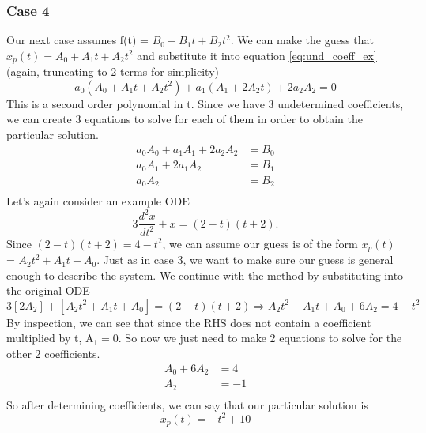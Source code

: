 \documentclass{article}
\newcommand{\be}{\begin{equation}}
\newcommand{\ee}{\end{equation}}
\begin{document}
\subsubsection*{Case 4}
Our next case assumes f(t) = $B_0 + B_1t + B_2t^2$. We can make the guess that $x_p(t) = A_0 + A_1t + A_2t^2$ and substitute it into equation \ref{eq:und_coeff_ex} (again, truncating to 2 terms for simplicity)
\be
a_0\left(A_0 + A_1t + A_2t^2\right) + a_1\left(A_1 + 2A_2t\right) + 2a_2A_2 = 0
\ee
This is a second order polynomial in t. Since we have 3 undetermined coefficients, we can create 3 equations to solve for each of them in order to obtain the particular solution.
\be
\begin{split}
    a_0A_0 + a_1A_1 + 2a_2A_2 &= B_0\\
    a_0A_1 + 2a_1A_2 &= B_1\\
    a_0A_2 &= B_2\\
\end{split}
\ee
Let's again consider an example ODE
\be
3 \frac{d^2 x}{dt^2} + x = (2-t)(t+2) .
\ee
Since $(2-t)(t+2) = 4 - t^2$, we can assume our guess is of the form $x_p(t)$ = $A_2t^2 + A_1t + A_0$.
Just as in case 3, we want to make sure our guess is general enough to describe the system.
We continue with the method by substituting into the original ODE
\be
3[2A_2] + [A_2t^2 + A_1t + A_0] = (2 - t)(t + 2) \Rightarrow A_2t^2 + A_1t + A_0 + 6A_2 = 4 - t^2
\ee
By inspection, we can see that since the RHS does not contain a coefficient multiplied by t, A$_1 = 0$.
So now we just need to make 2 equations to solve for the other 2 coefficients.
\be
\begin{split}
A_0 + 6A_2 &= 4\\
A_2 &= -1\\
\end{split}
\ee
So after determining coefficients, we can say that our particular solution is
\be
x_p(t) = -t^2 + 10
\ee
\end{document}
